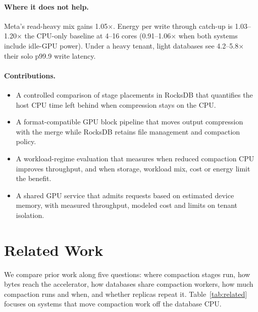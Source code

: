 \documentclass[sigconf, nonacm]{acmart}
\begin{document}
\paragraph{Where it does not help.} Meta's read-heavy mix gains 1.05$\times$. Energy per
write through catch-up is 1.03--1.20$\times$ the CPU-only baseline at 4--16 cores
(0.91--1.06$\times$ when both systems include idle-GPU power). Under a heavy tenant,
light databases see 4.2--5.8$\times$ their solo p99.9 write latency.

\paragraph{Contributions.}
\begin{itemize}
  \item A controlled comparison of stage placements in RocksDB that quantifies the
        host CPU time left behind when compression stays on the CPU.
  \item A format-compatible GPU block pipeline that moves output compression with the
        merge while RocksDB retains file management and compaction policy.
  \item A workload-regime evaluation that measures when reduced compaction CPU improves
        throughput, and when storage, workload mix, cost or energy limit the benefit.
  \item A shared GPU service that admits requests based on estimated device memory,
        with measured throughput, modeled cost and limits on tenant isolation.
\end{itemize}

\section{Related Work}
\label{sec:related}

We compare prior work along five questions: where compaction stages run, how bytes reach
the accelerator, how databases share compaction workers, how much compaction runs and when,
and whether replicas repeat it. Table~\ref{tab:related} focuses on systems that move
compaction work off the database CPU.
\end{document}
